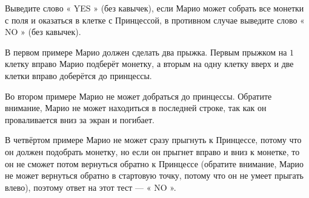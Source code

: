 \begin{problem}
Выведите слово « YES » (без кавычек), если Марио может собрать все монетки с поля и оказаться в клетке с Принцессой, в противном случае выведите слово « NO » (без кавычек).

\Examples

\begin{example}
%
%
%
%
\end{example}

\Explanation

В первом примере Марио должен сделать два прыжка. Первым прыжком на $1$ клетку вправо Марио подберёт монетку, а вторым на одну клетку вверх и две клетки вправо доберётся до принцессы.

Во втором примере Марио не может добраться до принцессы. Обратите внимание, Марио не может находиться в последней строке, так как он проваливается вниз за экран и погибает.

В четвёртом примере Марио не может сразу прыгнуть к Принцессе, потому что он должен подобрать монетку, но если он прыгнет вправо и вниз к монетке, то он не сможет потом вернуться обратно к Принцессе (обратите внимание, Марио не может вернуться обратно в стартовую точку, потому что он не умеет прыгать влево), поэтому ответ на этот тест — « NO ».

\end{problem}